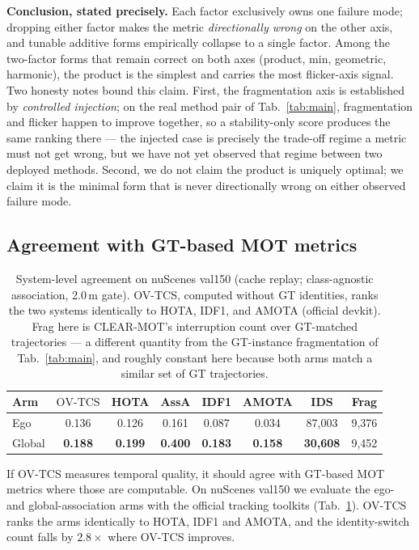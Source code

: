 \documentclass[10pt,twocolumn,letterpaper]{article}
\newcommand{\ovtcs}{\mathrm{OV\text{-}TCS}}
\begin{document}
\noindent\textbf{Conclusion, stated precisely.} Each factor exclusively owns
one failure mode; dropping either factor makes the metric \emph{directionally
wrong} on the other axis, and tunable additive forms empirically collapse to
a single factor. Among the two-factor forms that remain correct on both axes
(product, min, geometric, harmonic), the product is the simplest and carries
the most flicker-axis signal. Two honesty notes bound this claim. First, the
fragmentation axis is established by \emph{controlled injection}; on the real
method pair of Tab.~\ref{tab:main}, fragmentation and flicker happen to
improve together, so a stability-only score produces the same ranking there
--- the injected case is precisely the trade-off regime a metric must not get
wrong, but we have not yet observed that regime between two deployed methods.
Second, we do not claim the product is uniquely optimal; we claim it is the
minimal form that is never directionally wrong on either observed failure
mode.

\subsection{Agreement with GT-based MOT metrics}
\label{sec:mot}

\begin{table}[t]
\centering\small
\setlength{\tabcolsep}{3.4pt}
\begin{tabular}{lccccccc}
\toprule
Arm & $\ovtcs$ & HOTA & AssA & IDF1 & AMOTA & IDS & Frag \\
\midrule
Ego    & 0.136 & 0.126 & 0.161 & 0.087 & 0.034 & 87{,}003 & 9{,}376 \\
Global & \textbf{0.188} & \textbf{0.199} & \textbf{0.400} & \textbf{0.183} & \textbf{0.158} & \textbf{30{,}608} & 9{,}452 \\
\bottomrule
\end{tabular}
\caption{System-level agreement on nuScenes val150 (cache replay;
class-agnostic association, 2.0\,m gate). OV-TCS, computed without GT
identities, ranks the two systems identically to HOTA, IDF1, and AMOTA
(official devkit). Frag here is CLEAR-MOT's interruption count over
GT-matched trajectories --- a different quantity from the GT-instance
fragmentation of Tab.~\ref{tab:main}, and roughly constant here because both
arms match a similar set of GT trajectories.}
\label{tab:mot_system}
\end{table}

If OV-TCS measures temporal quality, it should agree with GT-based MOT
metrics where those are computable. On nuScenes val150 we evaluate the ego-
and global-association arms with the official tracking toolkits
(Tab.~\ref{tab:mot_system}). OV-TCS ranks the arms identically to HOTA, IDF1
and AMOTA, and the identity-switch count falls by $2.8\times$ where OV-TCS
improves.
\end{document}
